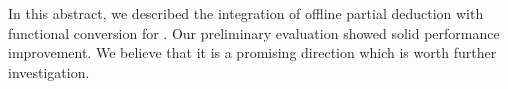 \documentclass[submission,copyright,creativecommons]{eptcs}
\begin{document}
In this abstract, we described the integration of offline partial deduction with functional conversion for \mk. 
Our preliminary evaluation showed solid performance improvement. 
We believe that it is a promising direction which is worth further investigation. 

 







\end{document}
